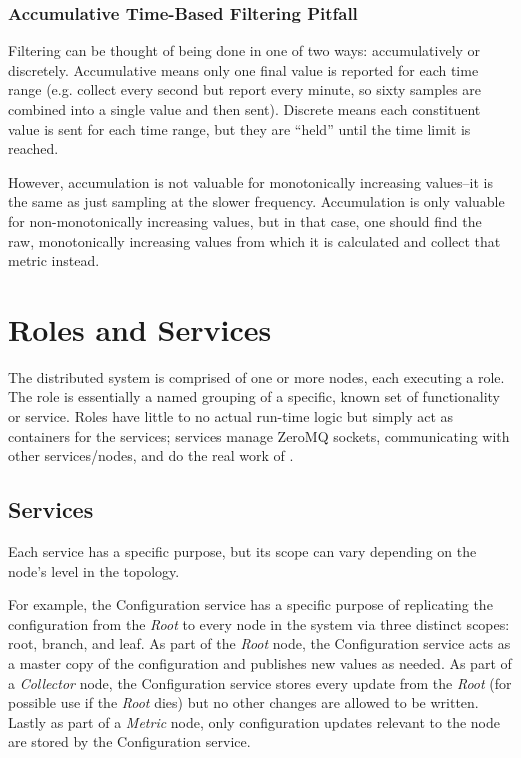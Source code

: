 \subsubsection{Accumulative Time-Based Filtering Pitfall}

Filtering can be thought of being done in one of two ways: accumulatively or discretely. Accumulative means only one
final value is reported for each time range (e.g. collect every second but report every minute, so sixty samples are
combined into a single value and then sent). Discrete means each constituent value is sent for each time range, but they
are ``held'' until the time limit is reached.

However, accumulation is not valuable for monotonically increasing values--it is the same as just sampling at the slower
frequency. Accumulation is only valuable for non-monotonically increasing values, but in that case, one should find the
raw, monotonically increasing values from which it is calculated and collect that metric instead.

\section{\dcamp Roles and Services}
\label{roles_and_services}

The \dcamp distributed system is comprised of one or more nodes, each executing a role. The role is essentially a named
grouping of a specific, known set of functionality or service. Roles have little to no actual run-time logic but simply
act as containers for the services; services manage ZeroMQ sockets, communicating with other services/nodes, and do the
real work of \dcamp.

\subsection{Services}

Each \dcamp service has a specific purpose, but its scope can vary depending on the node's level in the \dcamp topology.

For example, the Configuration service has a specific purpose of replicating the \dcamp configuration from the
\textit{Root} to every node in the system via three distinct scopes: root, branch, and leaf. As part of the
\textit{Root} node, the Configuration service acts as a master copy of the configuration and publishes new values as
needed. As part of a \textit{Collector} node, the Configuration service stores every update from the \textit{Root} (for
possible use if the \textit{Root} dies) but no other changes are allowed to be written. Lastly as part of a
\textit{Metric} node, only configuration updates relevant to the node are stored by the Configuration service.

